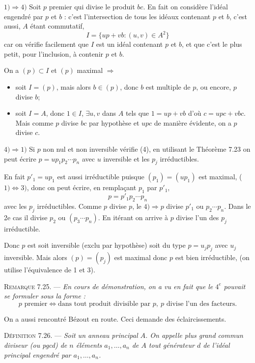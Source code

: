 $1)\Rightarrow4)$ Soit $p$ premier qui divise le produit $bc$. En fait on considère l'idéal engendré par $p$ et $b$ : c'est l'intersection de tous les idéaux contenant $p$ et $b$, c'est aussi, $A$ étant commutatif,
\[
I=\{up+vb:(u,v)\in A^2\}
\]
car on vérifie facilement que $I$ est un idéal contenant $p$ et $b$, et que c'est le plus petit, pour l'inclusion, à contenir $p$ et $b$.

On a $(p)\subset I$ et $(p)$ maximal $\Rightarrow$
\begin{itemize}[leftmargin=2.0em]
\item soit $I=(p)$, mais alors $b\in(p)$, donc $b$ est multiple de $p$, ou encore, $p$ divise $b$;
\item soit $I=A$, donc $1\in I$, $\exists u,v$ dans $A$ tels que $1=up+vb$ d'où $c=upc+vbc$. Mais comme $p$ divise $bc$ par hypothèse et $upc$ de manière évidente, on a $p$ divise $c$.
\end{itemize}

$4)\Rightarrow1)$ Si $p$ non nul et non inversible vérifie (4), en utilisant le Théorème 7.23 on peut écrire $p=up_1p_2\cdots p_n$ avec $u$ inversible et les $p_j$ irréductibles.

En fait $p'_1=up_1$ est aussi irréductible puisque $(p_1)=(up_1)$ est maximal, ($1)\Longleftrightarrow3)$, donc on peut écrire, en remplaçant $p_1$ par $p'_1$,
\[
p=p'_1p_2\cdots p_n
\]
avec les $p_j$ irréductibles. Comme $p$ divise $p$, le $4)\Rightarrow p$ divise $p'_1$ ou $p_2\cdots p_n$. Dans le 2e cas il divise $p_2$ ou $(p_3\cdots p_n)$. En itérant on arrive à $p$ divise l'un des $p_j$ irréductible.

Donc $p$ est soit inversible (exclu par hypothèse) soit du type $p=u_jp_j$ avec $u_j$ inversible. Mais alors $(p)=(p_j)$ est maximal donc $p$ est bien irréductible, (on utilise l'équivalence de 1 et 3). \bookend

\medskip\noindent\textsc{Remarque 7.25.} --- \emph{En cours de démonstration, on a vu en fait que le $4^e$ pouvait se formuler sous la forme :
\[
p\text{ premier}\Longleftrightarrow\text{dans tout produit divisible par }p,\ p\text{ divise l'un des facteurs}.
\]}

On a aussi rencontré Bézout en route. Ceci demande des éclaircissements.

\medskip\noindent\textsc{Définition 7.26.} --- \emph{Soit un anneau principal $A$. On appelle plus grand commun diviseur (ou pgcd) de $n$ éléments $a_1,\ldots,a_n$ de $A$ tout générateur $d$ de l'idéal principal engendré par $a_1,\ldots,a_n$.}

